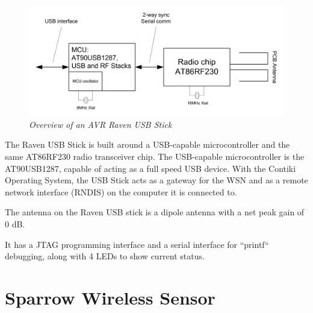 \begin{figure}[ht]
\begin{center}
\includegraphics[]{hw_platform/raven_stick_overview.png}
\end{center}
\caption{\small \itshape{Overview of an AVR Raven USB Stick}}
\end{figure}
The Raven USB Stick is built around a USB-capable microcontroller and the same AT86RF230 radio transceiver chip. The USB-capable 
microcontroller is the AT90USB1287, capable of acting as a full speed USB device. With the Contiki Operating System, the USB Stick
acts as a gateway for the WSN and as a remote network interface (RNDIS) on the computer it is connected to.

The antenna on the Raven USB stick is a dipole antenna with a net peak gain of 0 dB.

It has a JTAG programming interface and a serial interface for ``printf`` debugging, along with 4 LEDs to show current status.


\section{Sparrow Wireless Sensor} 

